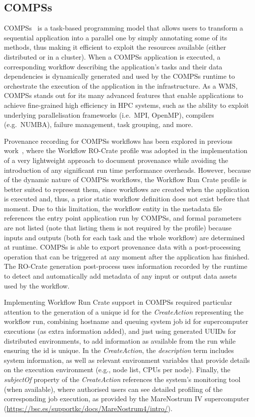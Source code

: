 \documentclass[10pt,letterpaper]{article}
\begin{document}
\subsection{COMPSs}\label{compss}

COMPSs~\cite{Lordan 2014} is a task-based programming model that allows users to transform a sequential application into a parallel one by simply annotating some of its methods, thus making it efficient to exploit the resources available (either distributed or in a cluster).
When a COMPSs application is executed, a corresponding workflow describing the application's tasks and their data dependencies is dynamically generated and used by the COMPSs runtime to orchestrate the execution of the application in the infrastructure.
As a WMS, COMPSs stands out for its many advanced features that enable applications to achieve fine-grained high efficiency in HPC systems, such as the ability to exploit underlying parallelisation frameworks (i.e.~MPI, OpenMP), compilers (e.g.~NUMBA), failure management, task grouping, and more.

Provenance recording for COMPSs workflows has been explored in previous work~\cite{Sirvent 2022}, where the Workflow RO-Crate profile was adopted in the implementation of a very lightweight approach to document provenance while avoiding the introduction of any significant run time performance overheads.
However, because of the dynamic nature of COMPSs workflows, the Workflow Run Crate profile is better suited to represent them, since workflows are created when the application is executed and, thus, a prior static workflow definition does not exist before that moment.
Due to this limitation, the workflow entity in the metadata file references the entry point application run by COMPSs, and formal parameters are not listed (note that listing them is not required by the profile) because inputs and outputs (both for each task and the whole workflow) are determined at runtime.
COMPSs is able to export provenance data with a post-processing operation that can be triggered at any moment after the application has finished.
The RO-Crate generation post-process uses information recorded by the runtime to detect and automatically add metadata of any input or output data assets used by the workflow.

Implementing Workflow Run Crate support in COMPSs required particular attention to the generation of a unique id for the \emph{CreateAction} representing the workflow run, combining hostname and queuing system job id for supercomputer executions (as extra information added), and just using generated UUIDs for distributed environments, to add information as available from the run while ensuring the id is unique.
In the \emph{CreateAction}, the \emph{description} term includes system information, as well as relevant environment variables that provide details on the execution environment (e.g., node list, CPUs per node).
Finally, the \emph{subjectOf} property of the \emph{CreateAction} references the system’s monitoring tool (when available),
where authorised users can see detailed profiling of the corresponding job execution, as provided by the MareNostrum IV supercomputer (\url{https://bsc.es/supportkc/docs/MareNostrum4/intro/}).
\end{document}
